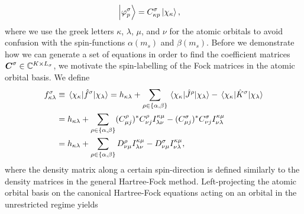             \begin{align}
                \ket{\varphi^{\sigma}_{p}}
                &= C^{\sigma}_{\kappa p} \ket{\chi_{\kappa}},
            \end{align}
            where we use the greek letters $\kappa$, $\lambda$, $\mu$, and $\nu$
            for the atomic orbitals to avoid confusion with the spin-functions
            $\alpha(m_s)$ and $\beta(m_s)$.
            Before we demonstrate how we can generate a set of equations in
            order to find the coefficient matrices $\boldsymbol{C}^{\sigma} \in
            \mathbb{C}^{K \times L_{\sigma}}$, we motivate the spin-labelling of
            the Fock matrices in the atomic orbital basis.
            We define
            \begin{align}
                f^{\sigma}_{\kappa\lambda}
                &\equiv
                \mel{\chi_{\kappa}}{\hat{f}^{\sigma}}{\chi_{\lambda}}
                =
                h_{\kappa\lambda}
                + \sum_{\rho \in \left\{ \alpha, \beta \right\}}
                \mel{\chi_{\kappa}}{
                    \hat{J}^{\rho}
                }{\chi_{\lambda}}
                - \mel{\chi_{\kappa}}{
                    \hat{K}^{\sigma}
                }{\chi_{\lambda}}
                \\
                &=
                h_{\kappa\lambda}
                + \sum_{\rho \in \left\{ \alpha, \beta \right\}}
                (C^{\rho}_{\mu j})^{*}
                C^{\rho}_{\nu j}
                I^{\kappa\mu}_{\lambda\nu}
                -
                (C^{\sigma}_{\mu j})^{*}
                C^{\sigma}_{\nu j}
                I^{\kappa\mu}_{\nu\lambda}
                \\
                &=
                h_{\kappa\lambda}
                + \sum_{\rho \in \left\{ \alpha, \beta \right\}}
                D^{\rho}_{\nu\mu}
                I^{\kappa\mu}_{\lambda\nu}
                -
                D^{\sigma}_{\nu\mu}
                I^{\kappa\mu}_{\nu\lambda},
            \end{align}
            where the density matrix along a certain spin-direction is defined
            similarly to the density matrices in the general Hartree-Fock
            method.
            Left-projecting the atomic orbital basis on the canonical
            Hartree-Fock equations acting on an orbital in the unrestricted
            regime yields
